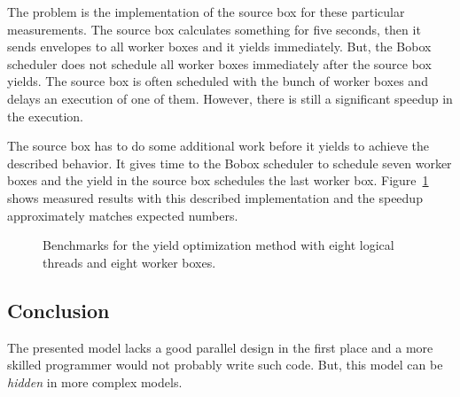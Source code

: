 The problem is the implementation of the source box for these particular measurements. The source box calculates something for five seconds, then it sends envelopes to all worker boxes and it yields immediately. But, the Bobox scheduler does not schedule all worker boxes immediately after the source box yields. The source box is often scheduled with the bunch of worker boxes and delays an execution of one of them. However, there is still a significant speedup in the execution.

The source box has to do some additional work before it yields to achieve the described behavior. It gives time to the Bobox scheduler to schedule seven worker boxes and the yield in the source box schedules the last worker box. Figure~\ref{yield-bench-better} shows measured results with this described implementation and the speedup approximately matches expected numbers.

\begin{figure}[h!]
\vspace{.5cm}
\centering
{}
\caption{Benchmarks for the yield optimization method with eight logical threads and eight worker boxes.}
\label{yield-bench-better}
\end{figure}

\subsection{Conclusion}
The presented model lacks a good parallel design in the first place and a more skilled programmer would not probably write such code. But, this model can be \textit{hidden} in more complex models.

